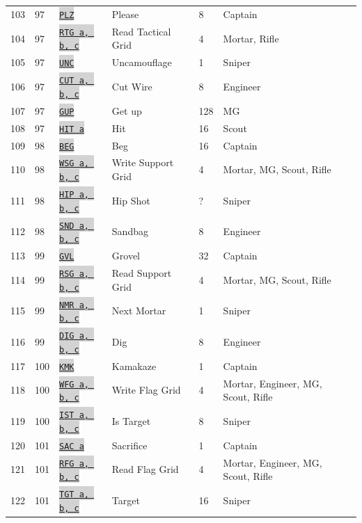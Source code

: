 \documentclass{article}
\newcommand{\vnscode}[1]{\colorbox{lightgray}{\lstinline[language=vns]{#1}}}
\begin{document}
\begin{longtable}{lllllll}
    103 & 97 & \hyperref[table:resource]{\vnscode{PLZ}} & Please & 8 & Captain \\
    104 & 97 & \hyperref[table:grid]{\vnscode{RTG a, b, c}} & Read Tactical Grid & 4 & Mortar, Rifle \\
    105 & 97 & \hyperref[table:sniper]{\vnscode{UNC}} & Uncamouflage & 1 & Sniper \\
    106 & 97 & \hyperref[table:combat]{\vnscode{CUT a, b, c}} & Cut Wire & 8 & Engineer \\
    107 & 97 & \hyperref[table:combat]{\vnscode{GUP}} & Get up & 128 & MG \\
    108 & 97 & \hyperref[table:combat]{\vnscode{HIT a}} & Hit & 16 & Scout \\
    109 & 98 & \hyperref[table:resource]{\vnscode{BEG}} & Beg & 16 & Captain \\
    110 & 98 & \hyperref[table:grid]{\vnscode{WSG a, b, c}} & Write Support Grid & 4 & Mortar, MG, Scout, Rifle \\
    111 & 98 & \hyperref[table:combat]{\vnscode{HIP a, b, c}} & Hip Shot & ? & Sniper \\
    112 & 98 & \hyperref[table:combat]{\vnscode{SND a, b, c}} & Sandbag & 8 & Engineer \\
    113 & 99 & \hyperref[table:resource]{\vnscode{GVL}} & Grovel & 32 & Captain \\
    114 & 99 & \hyperref[table:grid]{\vnscode{RSG a, b, c}} & Read Support Grid & 4 & Mortar, MG, Scout, Rifle \\
    115 & 99 & \hyperref[table:sniper]{\vnscode{NMR a, b, c}} & Next Mortar & 1 & Sniper \\
    116 & 99 & \hyperref[table:combat]{\vnscode{DIG a, b, c}} & Dig & 8 & Engineer \\
    117 & 100 & \hyperref[table:resource]{\vnscode{KMK}} & Kamakaze & 1 & Captain \\
    118 & 100 & \hyperref[table:grid]{\vnscode{WFG a, b, c}} & Write Flag Grid & 4 & Mortar, Engineer, MG, Scout, Rifle \\
    119 & 100 & \hyperref[table:sniper]{\vnscode{IST a, b, c}} & Is Target & 8 & Sniper \\
    120 & 101 & \hyperref[table:resource]{\vnscode{SAC a}} & Sacrifice & 1 & Captain \\
    121 & 101 & \hyperref[table:grid]{\vnscode{RFG a, b, c}} & Read Flag Grid & 4 & Mortar, Engineer, MG, Scout, Rifle \\
    122 & 101 & \hyperref[table:sniper]{\vnscode{TGT a, b, c}} & Target & 16 & Sniper \\

\end{longtable}
\end{document}

